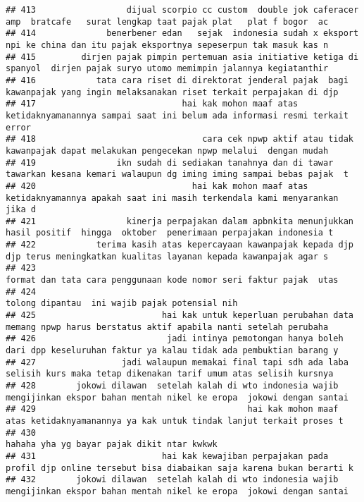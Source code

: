 \documentclass[
]{article}
\begin{document}
\begin{verbatim}
## 413                  dijual scorpio cc custom  double jok caferacer amp  bratcafe   surat lengkap taat pajak plat   plat f bogor  ac
## 414              benerbener edan   sejak  indonesia sudah x eksport npi ke china dan itu pajak eksportnya sepeserpun tak masuk kas n
## 415         dirjen pajak pimpin pertemuan asia initiative ketiga di spanyol  dirjen pajak suryo utomo memimpin jalannya kegiatanthir
## 416            tata cara riset di direktorat jenderal pajak  bagi kawanpajak yang ingin melaksanakan riset terkait perpajakan di djp
## 417                             hai kak mohon maaf atas ketidaknyamanannya sampai saat ini belum ada informasi resmi terkait error  
## 418                                 cara cek npwp aktif atau tidak  kawanpajak dapat melakukan pengecekan npwp melalui  dengan mudah
## 419                ikn sudah di sediakan tanahnya dan di tawar tawarkan kesana kemari walaupun dg iming iming sampai bebas pajak  t 
## 420                               hai kak mohon maaf atas ketidaknyamannya apakah saat ini masih terkendala kami menyarankan jika d 
## 421                  kinerja perpajakan dalam apbnkita menunjukkan hasil positif  hingga  oktober  penerimaan perpajakan indonesia t
## 422            terima kasih atas kepercayaan kawanpajak kepada djp  djp terus meningkatkan kualitas layanan kepada kawanpajak agar s
## 423                                                              format dan tata cara penggunaan kode nomor seri faktur pajak  utas 
## 424                                                                                   tolong dipantau  ini wajib pajak potensial nih
## 425                         hai kak untuk keperluan perubahan data memang npwp harus berstatus aktif apabila nanti setelah perubaha 
## 426                          jadi intinya pemotongan hanya boleh dari dpp keseluruhan faktur ya kalau tidak ada pembuktian barang y 
## 427                 jadi walaupun memakai final tapi sdh ada laba selisih kurs maka tetap dikenakan tarif umum atas selisih kursnya 
## 428        jokowi dilawan  setelah kalah di wto indonesia wajib mengijinkan ekspor bahan mentah nikel ke eropa  jokowi dengan santai
## 429                                          hai kak mohon maaf atas ketidaknyamanannya ya kak untuk tindak lanjut terkait proses t 
## 430                                                                                       hahaha yha yg bayar pajak dikit ntar kwkwk
## 431                         hai kak kewajiban perpajakan pada profil djp online tersebut bisa diabaikan saja karena bukan berarti k 
## 432        jokowi dilawan  setelah kalah di wto indonesia wajib mengijinkan ekspor bahan mentah nikel ke eropa  jokowi dengan santai

\end{verbatim}
\end{document}
